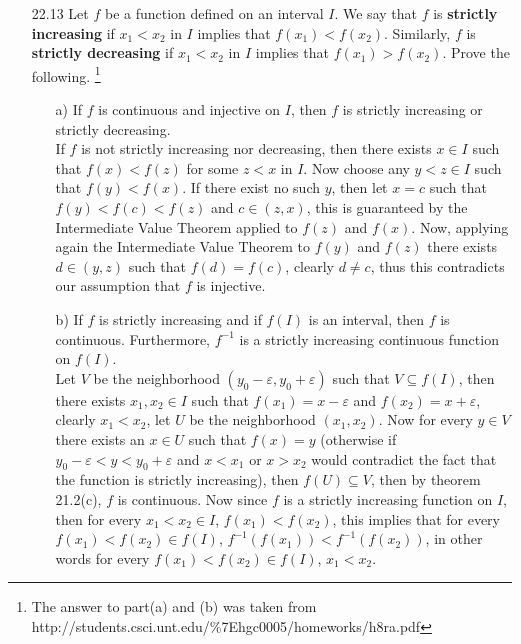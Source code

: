 \documentclass[12pt]{article}
\begin{document}
\begin{enumerate}
\begin{enumerate}
\item[22.13] Let $f$ be a function defined on an interval $I$. We say that $f$ is {\bf strictly increasing} if $x_1 < x_2$ in $I$ implies that $f(x_1) < f(x_2)$. Similarly, $f$ is {\bf strictly decreasing} if $x_1 < x_2$ in $I$ implies that $f(x_1) > f(x_2)$. Prove the following.
\footnote{
The answer to part(a) and (b) was taken from\\
http://students.csci.unt.edu/\%7Ehgc0005/homeworks/h8ra.pdf
}
\begin{enumerate}
\item[a)] If $f$ is continuous and injective on $I$, then $f$ is strictly increasing or strictly decreasing. \\
If $f$ is not strictly increasing nor decreasing, then there exists
$x \in I$ such that $f(x) < f(z)$ for some $z < x$ in $I$. Now choose any 
$y < z \in I$ such that $f(y) < f(x)$. If there exist no such $y$, then let
$x = c$ such that $f(y) < f(c) < f(z)$ and $c \in (z, x)$, this is guaranteed
by the Intermediate Value Theorem applied to $f(z)$ and $f(x)$. Now, applying
again the Intermediate Value Theorem to $f(y)$ and $f(z)$ there exists 
$d \in (y, z)$ such that $f(d) = f(c)$, clearly $d \neq c$, thus this 
contradicts our assumption that $f$ is injective.
\item[b)] If $f$ is strictly increasing and if $f(I)$ is an interval, then $f$ is continuous. Furthermore, $f^{-1}$ is a strictly increasing continuous function on $f(I)$. \\
Let $V$ be the neighborhood $(y_0 - \varepsilon, y_0 + \varepsilon)$ 
such that $V \subseteq f(I)$, then there exists $x_1, x_2 \in I$ such that
$f(x_1) = x - \varepsilon$ and $f(x_2) = x + \varepsilon$, 
clearly $x_1 < x_2$, let $U$ be the neighborhood $(x_1, x_2)$. Now for every
$y \in V$ there exists an $x \in U$ such that $f(x) = y$ (otherwise if 
$y_0 - \varepsilon < y < y_0 + \varepsilon$ and $x < x_1$ or $x > x_2$ would
contradict the fact that the function is strictly increasing), then $f(U) 
\subseteq V$, then by theorem 21.2(c), $f$ is continuous. Now since $f$
is a strictly increasing function on $I$, then for every $x_1 < x_2 \in I$, 
$f(x_1) < f(x_2)$, this implies that for every $f(x_1) < f(x_2) \in f(I)$,
$f^{-1}(f(x_1)) < f^{-1}(f(x_2))$, in other words for every
$f(x_1) < f(x_2) \in f(I)$, $x_1 < x_2$.
\end{enumerate}


\end{enumerate}
\end{enumerate}
\end{document}
